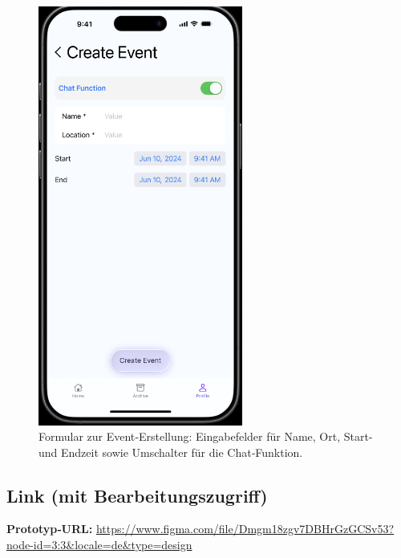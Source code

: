 \documentclass[11pt,a4paper]{article}
\begin{document}
\begin{figure}[h]
  \centering
  \includegraphics[width=0.6\textwidth]{image-9.png}
  \caption{Formular zur Event‑Erstellung: Eingabefelder für Name, Ort, Start- und Endzeit sowie Umschalter für die Chat‑Funktion.}
  \label{fig:create}
\end{figure}

\subsection*{Link (mit Bearbeitungszugriff)}
\textbf{Prototyp‑URL:} \url{https://www.figma.com/file/Dmgm18zgv7DBHrGzGCSv53?node-id=3:3&locale=de&type=design}
\end{document}
